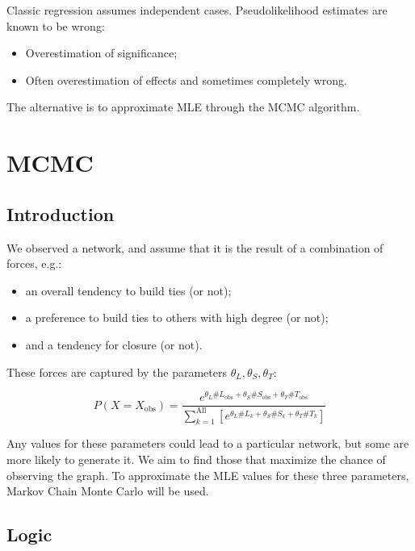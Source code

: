 \documentclass[
  notitlepage,
  onecolumn,
  openany]{book}
\providecommand{\tightlist}{%
  \setlength{\itemsep}{0pt}\setlength{\parskip}{0pt}}
\begin{document}
Classic regression assumes independent cases. Pseudolikelihood estimates are known to be wrong:

\begin{itemize}
\tightlist
\item
  Overestimation of significance;
\item
  Often overestimation of effects and sometimes completely wrong.
\end{itemize}

The alternative is to approximate MLE through the MCMC algorithm.

\hypertarget{mcmc}{%
\section{MCMC}\label{mcmc}}

\hypertarget{introduction-3}{%
\subsection{Introduction}\label{introduction-3}}

We observed a network, and assume that it is the result of a combination of forces, e.g.:

\begin{itemize}
\tightlist
\item
  an overall tendency to build ties (or not);
\item
  a preference to build ties to others with high degree (or not);
\item
  and a tendency for closure (or not).
\end{itemize}

These forces are captured by the parameters \(\theta_L, \theta_S, \theta_T\):

\[
P(X=X_{\text{obs}}) = \frac{e^{\theta_{L} \# L_{\text {obs}}+\theta_{S} \# S_{\text {obs}}+\theta_{T} \# T_{\text{obs}}}}{\sum_{k=1}^{\text{All }}[e^{\theta_{L} \#L_{k}+\theta_{S} \# S_{k}+\theta_{T} \#T_{k}}]}
\]

Any values for these parameters could lead to a particular network, but some are more likely to generate it. We aim to find those that maximize the chance of observing the graph. To approximate the MLE values for these three parameters, Markov Chain Monte Carlo will be used.

\hypertarget{logic}{%
\subsection{Logic}\label{logic}}
\end{document}
